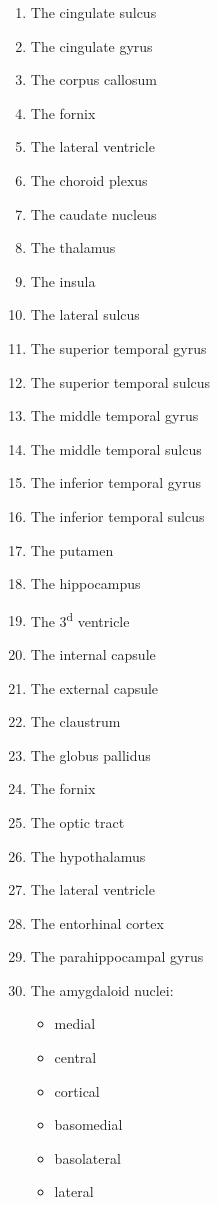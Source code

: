\documentclass[]{book}
\providecommand{\tightlist}{%
  \setlength{\itemsep}{0pt}\setlength{\parskip}{0pt}}
\begin{document}
\begin{enumerate}
\def\labelenumi{\arabic{enumi}.}
\tightlist
\item
  The cingulate sulcus
\item
  The cingulate gyrus
\item
  The corpus callosum
\item
  The fornix
\item
  The lateral ventricle
\item
  The choroid plexus
\item
  The caudate nucleus
\item
  The thalamus
\item
  The insula
\item
  The lateral sulcus
\item
  The superior temporal gyrus
\item
  The superior temporal sulcus
\item
  The middle temporal gyrus
\item
  The middle temporal sulcus
\item
  The inferior temporal gyrus
\item
  The inferior temporal sulcus
\item
  The putamen
\item
  The hippocampus
\item
  The 3\textsuperscript{d} ventricle
\item
  The internal capsule
\item
  The external capsule
\item
  The claustrum
\item
  The globus pallidus
\item
  The fornix
\item
  The optic tract
\item
  The hypothalamus
\item
  The lateral ventricle
\item
  The entorhinal cortex
\item
  The parahippocampal gyrus
\item
  The amygdaloid nuclei:

  \begin{itemize}
  \tightlist
  \item
    medial
  \item
    central
  \item
    cortical
  \item
    basomedial
  \item
    basolateral
  \item
    lateral
  \end{itemize}
\end{enumerate}
\end{document}

